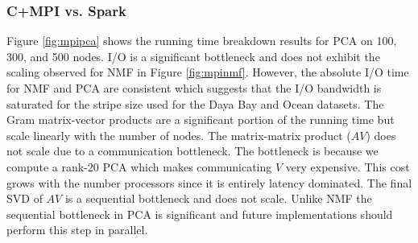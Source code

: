 \subsubsection{C+MPI vs. Spark}
Figure \ref{fig:mpipca} shows the running time breakdown results for PCA on 100, 300, and 500 nodes. I/O is a significant bottleneck and does not exhibit the scaling observed for NMF in Figure \ref{fig:mpinmf}. However, the absolute I/O time for NMF and PCA are consistent which suggests that the I/O bandwidth is saturated for the stripe size used for the Daya Bay and Ocean datasets. The Gram matrix-vector products are a significant portion of the running time but scale linearly with the number of nodes. The matrix-matrix product ($AV$) does not scale due to a communication bottleneck. The bottleneck is because we compute a rank-$20$ PCA which makes communicating $V$ very expensive. This cost grows with the number processors since it is entirely latency dominated. The final SVD of $AV$ is a sequential bottleneck and does not scale. Unlike NMF the sequential bottleneck in PCA is significant and future implementations should perform this step in parallel.

